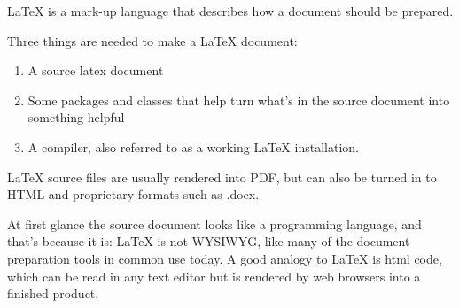 LaTeX is a mark-up language that describes how a document should be prepared.

Three things are needed to make a LaTeX document:
\begin{enumerate}
\item A source latex document
\item Some packages and classes that help turn what's in the source document into something helpful
\item A compiler, also referred to as a working LaTeX installation.
\end{enumerate}

LaTeX source files are usually rendered into PDF, but can also be turned in to HTML and proprietary formats such as .docx. 

At first glance the source document looks like a programming language, and that's because it is: LaTeX is not WYSIWYG, like many of the document preparation tools in common use today. A good analogy to LaTeX is html code, which can be read in any text editor but is rendered by web browsers into a finished product.


